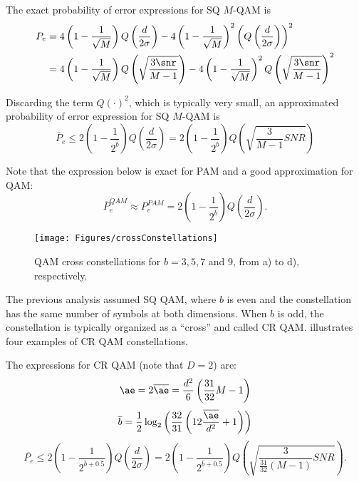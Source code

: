 The exact probability of error expressions for SQ $M$-QAM is
\begin{align*}
P_e &= 4 \left(1 - \frac 1 {\sqrt{M}} \right) Q \left( \frac{d}{2 \sigma} \right) -	4 \left(1 - \frac 1 {\sqrt{M}}\right)^2 \left( Q \left( \frac{d}{2 \sigma} \right) \right) ^2	\\
    &=  4 \left(1 - \frac 1 {\sqrt{M}} \right) Q \left( \sqrt{\frac{3 \snr}{M-1}} \right) -	4 \left(1 - \frac 1 {\sqrt{M}}\right)^2 Q \left( \sqrt{\frac{3 \snr}{M-1}} \right)^2
	\label{eq:qam_pe}
\end{align*}	
	
Discarding the term $Q(\cdot)^2$, which is typically very small, an approximated probability of error expression for SQ $M$-QAM is
\begin{equation}
	\overline{P}_e \le 2 \left(1 - \frac 1 { 2^{\overline{b}} } \right)	Q \left( \frac{d}{2 \sigma} \right)
	 = 2 \left(1 - \frac 1 {2^{\overline{b}}}\right) Q \left( \sqrt{\frac{3}{M-1}SNR} \right)
	\label{eq:qam_pe_approx}
\end{equation}
	 		
Note that the expression below is exact for PAM and a good approximation for QAM:
	\begin{equation}
	\overline{P}_e^{QAM} \approx P_e^{PAM} = 2 \left(1 - \frac 1 { 2^{\overline{b}} } \right)	Q \left( \frac{d}{2 \sigma} \right).
	\label{eq:prob_errors}
\end{equation}

\begin{figure}[htbp]
\centering
\texttt{[image: Figures/crossConstellations]}
\caption{QAM cross constellations for $b=3, 5, 7$ and 9, from a) to d), respectively.\label{fig:crossConstellations}}
\end{figure}

The previous analysis assumed SQ QAM, where $b$ is even and the constellation has the same number of symbols at both dimensions. When $b$ is odd, the constellation is typically organized as a ``cross'' and called CR QAM.  illustrates four examples of CR QAM constellations.
	
The expressions for CR QAM (note that $D=2$) are:
	$$\ae = 2\overline{\ae} = \frac{d^2}{6} \left( \frac {31} {32} M -1 \right)$$	
	$$\overline{b} = \frac 1 2 \log_2 \left(\frac {32} {31} \left(12 \frac{\overline{\ae}}{d^2}+1 \right) \right)$$	
	$$\overline{P_e} \le 2 \left(1 - \frac 1 { 2^{\overline{b}+0.5} } \right)	Q \left( \frac{d}{2 \sigma} \right)
	 = 2 \left(1 - \frac 1 {2^{\overline{b}+0.5}}\right) Q \left( \sqrt{\frac{3}{\frac {31} {32} (M-1)}SNR} \right).$$	

